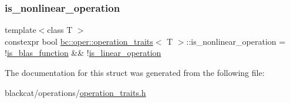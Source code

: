 \subsubsection{\texorpdfstring{is\+\_\+nonlinear\+\_\+operation}{is\_nonlinear\_operation}}
{\footnotesize\ttfamily template$<$class T $>$ \\
constexpr bool \hyperlink{structbc_1_1oper_1_1operation__traits}{bc\+::oper\+::operation\+\_\+traits}$<$ T $>$\+::is\+\_\+nonlinear\+\_\+operation = !\hyperlink{structbc_1_1oper_1_1operation__traits_a330c3f46193bcb67fb5c65464ea9c0fa}{is\+\_\+blas\+\_\+function} \&\& !\hyperlink{structbc_1_1oper_1_1operation__traits_a5c6b55625ee7aa6ea197fa8e3ad98ba6}{is\+\_\+linear\+\_\+operation}\hspace{0.3cm}{\ttfamily [static]}}



The documentation for this struct was generated from the following file\+:\begin{DoxyCompactItemize}
\item 
blackcat/operations/\hyperlink{operation__traits_8h}{operation\+\_\+traits.\+h}\end{DoxyCompactItemize}
